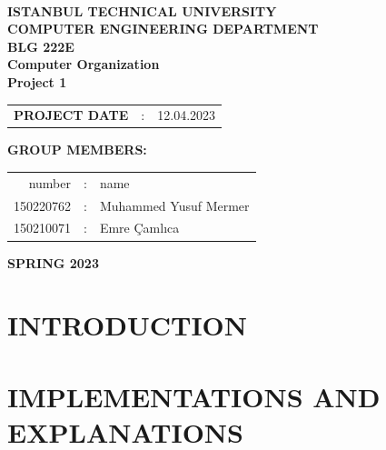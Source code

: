 \documentclass[pdftex,12pt,a4paper]{article}
\begin{document}
\begin{titlepage}
\begin{center}
\textbf{}\\
\textbf{\Large{ISTANBUL TECHNICAL UNIVERSITY}}\\
\vspace{0.5cm}
\textbf{\Large{COMPUTER ENGINEERING DEPARTMENT}}\\
\vspace{2cm}
\textbf{\Large{BLG 222E\\ Computer Organization \\ Project 1}}\\
\vspace{2.8cm}
\begin{table}[ht]
\centering
\Large{
\begin{tabular}{lcl}
\textbf{PROJECT DATE}  & : & 12.04.2023\\
\end{tabular}}
\end{table}
\vspace{1cm}
\textbf{\Large{GROUP MEMBERS:}}\\
\begin{table}[ht]
\centering
\Large{
\begin{tabular}{rcl}
number  & : & name \\
150220762  & : & Muhammed Yusuf Mermer  \\
150210071  & : & Emre Çamlıca \\
\end{tabular}}
\end{table}
\vspace{2.8cm}
\textbf{\Large{SPRING 2023}}

\end{center}

\end{titlepage}

\thispagestyle{empty}
\setcounter{tocdepth}{4}
\tableofcontents
\clearpage

\setcounter{page}{1}
\section{INTRODUCTION}


\section{IMPLEMENTATIONS AND EXPLANATIONS }
\end{document}
